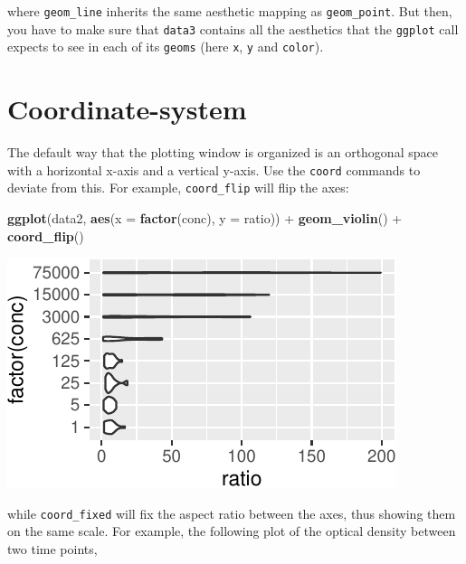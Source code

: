 \documentclass[]{book}
\newenvironment{Shaded}{}{}
\newcommand{\DataTypeTok}[1]{\textcolor[rgb]{0.56,0.13,0.00}{#1}}
\newcommand{\KeywordTok}[1]{\textcolor[rgb]{0.00,0.44,0.13}{\textbf{#1}}}
\newcommand{\NormalTok}[1]{#1}
\newcommand{\OperatorTok}[1]{\textcolor[rgb]{0.40,0.40,0.40}{#1}}
\newcommand{\StringTok}[1]{\textcolor[rgb]{0.25,0.44,0.63}{#1}}
\begin{document}
where \texttt{geom\_line} inherits the same aesthetic mapping as \texttt{geom\_point}. But then, you have to make sure that \texttt{data3} contains all the aesthetics that the \texttt{ggplot} call expects to see in each of its \texttt{geoms} (here \texttt{x}, \texttt{y} and \texttt{color}).

\hypertarget{coordinate-system}{%
\section{Coordinate-system}\label{coordinate-system}}

The default way that the plotting window is organized is an orthogonal space with a horizontal x-axis and a vertical y-axis. Use the \texttt{coord} commands to deviate from this. For example, \texttt{coord\_flip} will flip the axes:

\begin{Shaded}
\begin{Highlighting}[]
\KeywordTok{ggplot}\NormalTok{(data2, }\KeywordTok{aes}\NormalTok{(}\DataTypeTok{x =} \KeywordTok{factor}\NormalTok{(conc), }\DataTypeTok{y =}\NormalTok{ ratio)) }\OperatorTok{+}\StringTok{ }
\StringTok{  }\KeywordTok{geom_violin}\NormalTok{() }\OperatorTok{+}
\StringTok{  }\KeywordTok{coord_flip}\NormalTok{()}
\end{Highlighting}
\end{Shaded}

\begin{center}\includegraphics[width=\textwidth]{TRES-Tidy-Tutorial_files/figure-latex/unnamed-chunk-128-1} \end{center}

while \texttt{coord\_fixed} will fix the aspect ratio between the axes, thus showing them on the same scale. For example, the following plot of the optical density between two time points,
\end{document}
